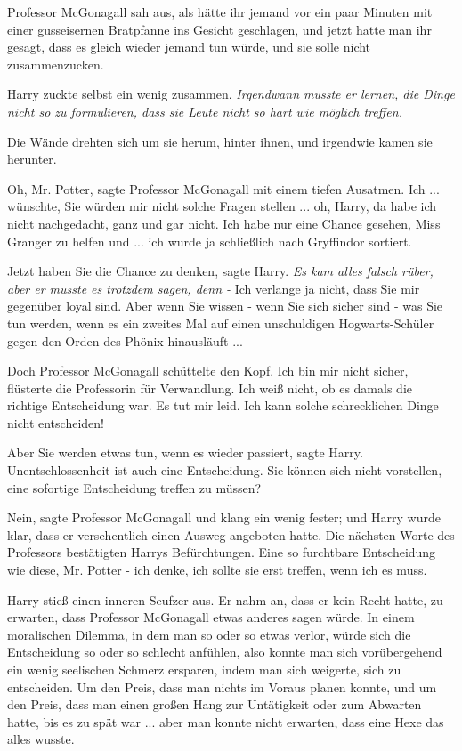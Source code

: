 Professor McGonagall sah aus, als hätte ihr jemand vor ein paar Minuten mit
einer gusseisernen Bratpfanne ins Gesicht geschlagen, und jetzt hatte man ihr
gesagt, dass es gleich wieder jemand tun würde, und sie solle nicht
zusammenzucken.

Harry zuckte selbst ein wenig zusammen. \emph{Irgendwann musste er lernen, die
Dinge nicht so zu formulieren, dass sie Leute nicht so hart wie möglich
treffen.}

Die Wände drehten sich um sie herum, hinter ihnen, und irgendwie kamen sie
herunter.

\glqq{}Oh, Mr. Potter\grqq{}, sagte Professor McGonagall mit einem tiefen
Ausatmen. \glqq{}Ich ... wünschte, Sie würden mir nicht solche Fragen stellen ...
oh, Harry, da habe ich nicht nachgedacht, ganz und gar nicht. Ich habe nur eine
Chance gesehen, Miss Granger zu helfen und ... ich wurde ja schließlich nach
Gryffindor sortiert.\grqq{}

\glqq{}Jetzt haben Sie die Chance zu denken\grqq{}, sagte Harry. \emph{Es kam
alles falsch rüber, aber er musste es trotzdem sagen, denn -} \glqq{}Ich verlange
ja nicht, dass Sie mir gegenüber loyal sind. Aber wenn Sie wissen - wenn Sie
sich sicher sind - was Sie tun werden, wenn es ein zweites Mal auf einen
unschuldigen Hogwarts-Schüler gegen den Orden des Phönix hinausläuft ...\grqq{}

Doch Professor McGonagall schüttelte den Kopf. \glqq{}Ich bin mir nicht
sicher\grqq{}, flüsterte die Professorin für Verwandlung. \glqq{}Ich weiß nicht,
ob es damals die richtige Entscheidung war. Es tut mir leid. Ich kann solche
schrecklichen Dinge nicht entscheiden!\grqq{}

\glqq{}Aber Sie werden etwas tun, wenn es wieder passiert\grqq{}, sagte Harry.
\glqq{}Unentschlossenheit ist auch eine Entscheidung. Sie können sich nicht
vorstellen, eine sofortige Entscheidung treffen zu müssen?\grqq{}

\glqq{}Nein\grqq{}, sagte Professor McGonagall und klang ein wenig fester; und
Harry wurde klar, dass er versehentlich einen Ausweg angeboten hatte. Die
nächsten Worte des Professors bestätigten Harrys Befürchtungen. \glqq{}Eine so
furchtbare Entscheidung wie diese, Mr. Potter - ich denke, ich sollte sie erst
treffen, wenn ich es muss.\grqq{}

Harry stieß einen inneren Seufzer aus. Er nahm an, dass er kein Recht hatte, zu
erwarten, dass Professor McGonagall etwas anderes sagen würde. In einem
moralischen Dilemma, in dem man so oder so etwas verlor, würde sich die
Entscheidung so oder so schlecht anfühlen, also konnte man sich vorübergehend
ein wenig seelischen Schmerz ersparen, indem man sich weigerte, sich zu
entscheiden. Um den Preis, dass man nichts im Voraus planen konnte, und um den
Preis, dass man einen großen Hang zur Untätigkeit oder zum Abwarten hatte, bis
es zu spät war ... aber man konnte nicht erwarten, dass eine Hexe das alles
wusste.

